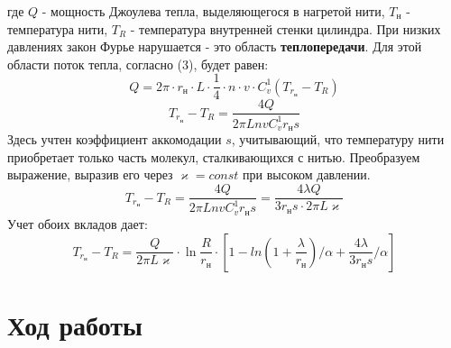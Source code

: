 \documentclass[a4paper]{article}
\begin{document}
	где $Q$ - мощность Джоулева тепла, выделяющегося в нагретой нити, $T_\text{н}$ - температура нити, $T_R$ - температура внутренней стенки цилиндра. 
	При низких давлениях закон Фурье нарушается - это область \textbf{теплопередачи}. Для этой области поток тепла, согласно (3), будет равен:
	\begin{equation}
	Q = 2\pi \cdot r_\text{н} \cdot L \cdot \frac{1}{4}\cdot n \cdot v \cdot C^1_v(T_{r_\text{н}} - T_R)
	\end{equation}
	\begin{equation}
	T_{r_\text{н}} - T_R = \frac{4Q}{2\pi L n v C^1_v r_\text{н}s}
	\end{equation}
	Здесь учтен коэффициент аккомодации $s$, учитывающий, что температуру нити приобретает только часть молекул, сталкивающихся с нитью. Преобразуем выражение, выразив его через $\varkappa = const$ при высоком давлении.
	\begin{equation}
	T_{r_\text{н}} - T_R = \frac{4Q}{2\pi L n v C^1_v r_\text{н}s}=\frac{4\lambda Q}{3r_\text{н}s\cdot 2\pi L \varkappa}
	\end{equation}
	Учет обоих вкладов дает:
	\begin{equation}
	T_{r_\text{н}} - T_R = \frac{Q}{2\pi L \varkappa}\cdot \ln \frac{R}{r_\text{н}}\cdot \left[1-ln\left(1+\frac{\lambda}{r_\text{н}}\right)/\alpha + \frac{4\lambda}{3r_\text{н}s}/\alpha\right]
	\end{equation}
	\section{Ход работы}
\end{document}
